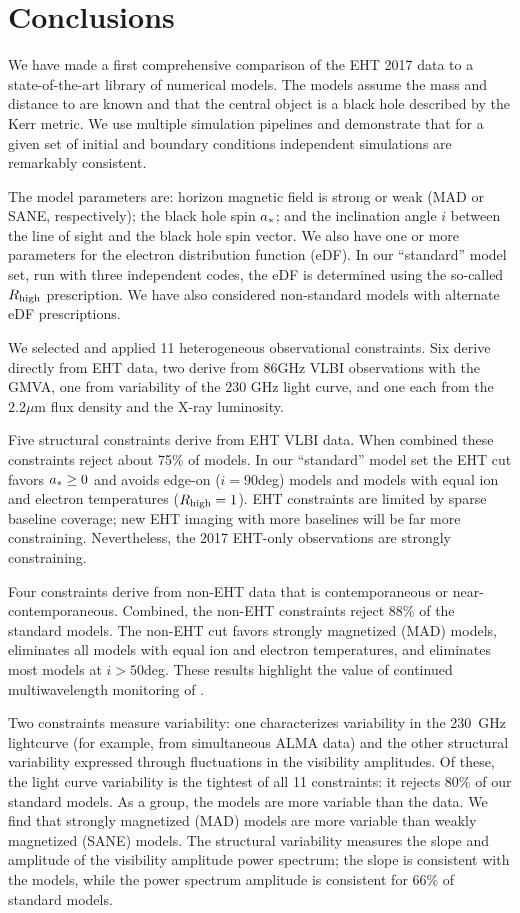 \section{Conclusions}
\label{sec:conclusions}

We have made a first comprehensive comparison of the EHT 2017 \sgra data to a state-of-the-art library of numerical models.  The models assume the mass and distance to \sgra are known and that the central object is a black hole described by the Kerr metric. We use multiple simulation pipelines and demonstrate that for a given set of initial and boundary conditions independent simulations are remarkably consistent.  

The model parameters are: horizon magnetic field is strong or weak (MAD or SANE, respectively); the black hole spin $a_*$; and the inclination angle $i$ between the line of sight and the black hole spin vector.  We also have one or more parameters for the electron distribution function (eDF).  In our ``standard'' model set, run with three independent codes, the eDF is determined using the so-called $R_\mathrm{high}$ prescription.  We have also considered non-standard models with alternate eDF prescriptions.   

We selected and applied 11 heterogeneous observational constraints.  Six derive directly from EHT data, two derive from 86GHz VLBI observations with the GMVA, one from variability of the 230 GHz light curve, and one each from the $2.2\mu$m flux density and the X-ray luminosity.  

Five structural constraints derive from EHT VLBI data.  When combined these constraints reject about 75\% of models.  In our ``standard'' model set the EHT cut favors $a_* \ge 0$ and avoids edge-on ($i = 90$deg) models and models with equal ion and electron temperatures ($R_\mathrm{high} = 1$).  EHT constraints are limited by sparse baseline coverage; new EHT imaging with more baselines will be far more constraining.  Nevertheless, the 2017  EHT-only observations are strongly constraining.

Four constraints derive from non-EHT data that is contemporaneous or near-contemporaneous.  Combined, the non-EHT constraints reject 88\% of the standard models.  The non-EHT cut favors strongly magnetized (MAD) models, eliminates all models with equal ion and electron temperatures, and eliminates most models at $i > 50$deg.  These results highlight the value of continued multiwavelength monitoring of \sgra.

Two constraints measure variability: one characterizes variability in the 230~GHz lightcurve (for example, from simultaneous ALMA data) and the other structural variability expressed through fluctuations in the visibility amplitudes.  Of these, the light curve variability is the tightest of all 11 constraints: it rejects $80\%$ of our standard models.  As a group, the models are more variable than the data.  We find that strongly magnetized (MAD) models are more variable than weakly magnetized (SANE) models.  The structural variability measures the slope and amplitude of the visibility amplitude power spectrum; the slope is consistent with the models, while the power spectrum amplitude is consistent for 66\% of standard models. 

